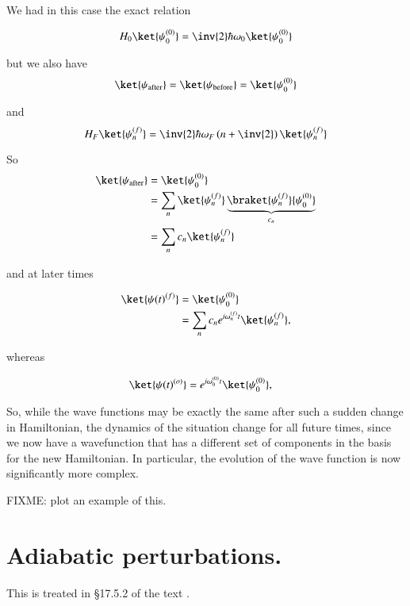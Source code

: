 We had in this case the exact relation

\begin{equation}\label{eqn:qmTwoL8:240}
H_0 \ket{\psi_0^{(0)}} = \inv{2} \hbar \omega_0 \ket{\psi_0^{(0)}}
\end{equation}

but we also have
\begin{equation}\label{eqn:qmTwoL8:260}
\ket{\psi_{\text{after}}} = \ket{\psi_{\text{before}}} = \ket{\psi_0^{(0)}}
\end{equation}

and
\begin{equation}\label{eqn:qmTwoL8:280}
H_F \ket{\psi_n^{(f)}} = \inv{2} \hbar \omega_F \left( n + \inv{2} \right) \ket{\psi_n^{(f)}}
\end{equation}

So
\begin{align*}
\ket{\psi_{\text{after}}}
&=
\ket{\psi_0^{(0)}} \\
&=
\sum_n \ket{\psi_n^{(f)}}
\underbrace{\braket{\psi_n^{(f)}}{\psi_0^{(0)}} }_{c_n} \\
&=
\sum_n c_n \ket{\psi_n^{(f)}}
\end{align*}

and at later times

\begin{align*}
\ket{\psi(t)^{(f)}}
&=
\ket{\psi_0^{(0)}} \\
&=
\sum_n c_n e^{i \omega_n^{(f)} t} \ket{\psi_n^{(f)}},
\end{align*}

whereas

\begin{align*}
\ket{\psi(t)^{(o)}}
&=
e^{i \omega_0^{(0)} t} \ket{\psi_0^{(0)}},
\end{align*}

So, while the wave functions may be exactly the same after such a sudden change in Hamiltonian, the dynamics of the situation change for all future times, since we now have a wavefunction that has a different set of components in the basis for the new Hamiltonian.  In particular, the evolution of the wave function is now significantly more complex.

FIXME: plot an example of this.

\section{Adiabatic perturbations.}

This is treated in \S 17.5.2 of the text \cite{desai2009quantum}.

